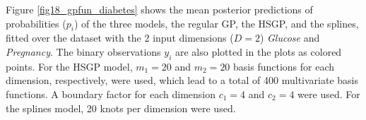 \documentclass[]{interact}
\theoremstyle{plain}%
\theoremstyle{definition}
\theoremstyle{remark}
\begin{document}
Figure \ref{fig18_gpfun_diabetes} shows the mean posterior predictions of probabilities ($p_i$) of the three models, the regular GP, the HSGP, and the splines, fitted over the dataset with the 2 input dimensions ($D=2$) \textit{Glucose} and \textit{Pregnancy}. The binary observations $y_i$ are also plotted in the plots as colored points. For the HSGP model, $m_1=20$ and $m_2=20$ basis functions for each dimension, respectively, were used, which lead to a total of 400 multivariate basis functions. A boundary factor for each dimension $c_1=4$ and $c_2=4$ were used. For the splines model, 20 knots per dimension were used.
%
\begin{figure}
\centering
{}

\end{figure}
\end{document}

